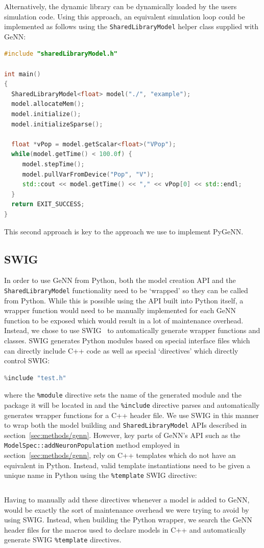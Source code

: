 \documentclass[utf8]{frontiersSCNS} %
\begin{document}
%
Alternatively, the dynamic library can be dynamically loaded by the users simulation code.
Using this approach, an equivalent simulation loop could be implemented as follows using the \lstinline{SharedLibraryModel} helper class supplied with GeNN:
%
\begin{lstlisting}[language=C++]
#include "sharedLibraryModel.h"

int main()
{
  SharedLibraryModel<float> model("./", "example");
  model.allocateMem();
  model.initialize();
  model.initializeSparse();

  float *vPop = model.getScalar<float>("VPop");
  while(model.getTime() < 100.0f) {
     model.stepTime();
     model.pullVarFromDevice("Pop", "V");
     std::cout << model.getTime() << "," << vPop[0] << std::endl;
  }
  return EXIT_SUCCESS;
}
\end{lstlisting}
%
This second approach is key to the approach we use to implement PyGeNN.

\subsection{SWIG}
In order to use GeNN from Python, both the model creation API and the \lstinline{SharedLibraryModel} functionality need to be `wrapped' so they can be called from Python.
While this is possible using the API built into Python itself, a wrapper function would need to be manually implemented for each GeNN function to be exposed which would result in a lot of maintenance overhead.
Instead, we chose to use SWIG~\citep{Beazley1996} to automatically generate wrapper functions and classes. 
SWIG generates Python modules based on special interface files which can directly include C++ code as well as special `directives' which directly control SWIG:
%
\begin{lstlisting}[language=C++]
%module(package="package") package
%include "test.h" 
\end{lstlisting}
%
where the \lstinline{%module} directive sets the name of the generated module and the package it will be located in and the \lstinline{%include} directive parses and automatically generates wrapper functions for a C++ header file.
We use SWIG in this manner to wrap both the model building and \lstinline{SharedLibraryModel} APIs described in section~\ref{sec:methods/genn}.
However, key parts of GeNN's API such as the \lstinline{ModelSpec::addNeuronPopulation} method employed in section~\ref{sec:methods/genn}, rely on C++ templates which do not have an equivalent in Python.
Instead, valid template instantiations need to be given a unique name in Python using the \lstinline{%template} SWIG directive:
%
\begin{lstlisting}[language=C++]
%template(addNeuronPopulationLIF) ModelSpec::addNeuronPopulation<NeuronModels::LIF>;
\end{lstlisting}
%
Having to manually add these directives whenever a model is added to GeNN, would be exactly the sort of maintenance overhead we were trying to avoid by using SWIG.
Instead, when building the Python wrapper, we search the GeNN header files for the macros used to declare models in C++ and automatically generate SWIG \lstinline{%template} directives.
\end{document}
